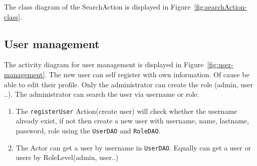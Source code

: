 \documentclass[11pt]{article}
\begin{document}
   The class diagram of the SearchAction is displayed in Figure~\ref{fig:searchAction-class}.
   
   \subsection{User management} %
    The activity diagram for user management is displayed in Figure~\ref{fig:user-management}. The new user can self register with own information. Of cause be able to edit their profile. Only the administrator can create the role (admin, user ..). The administrator can search the user via username or role.
    
    \begin{enumerate}
    	\item The \texttt{registerUser} Action(create user) will check whether the username already exist, if not then create a new user with username, name, lastname, password, role using the \texttt{UserDAO} and \texttt{RoleDAO}.
    	\item The Actor can get a user by username in \texttt{UserDAO}. Equally can get a user or users by RoleLevel(admin, user..) 
    \end{enumerate}
      
\end{document}
